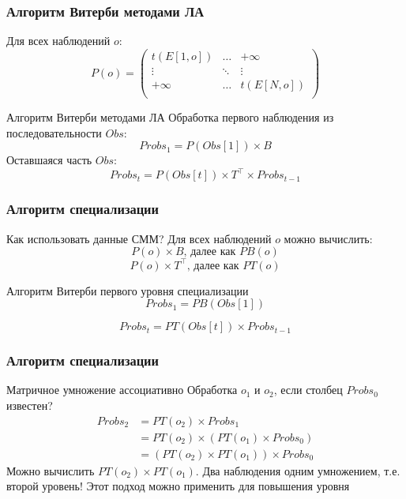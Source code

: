 \documentclass{beamer}
\begin{document}
\begin{frame}[fragile]
	\frametitle{Алгоритм Витерби методами ЛА}
	Для всех наблюдений $o$:
\[
  P(o) =
  \begin{pmatrix}
    t(E[1,o]) & \hdots & +\infty \\
    \vdots & \ddots & \vdots\\
    +\infty & \hdots & t(E[N,o]) \\
  \end{pmatrix}
\]
	\vfill
	\begin{block}{Алгоритм Витерби методами ЛА}
		Обработка первого наблюдения из последовательности $Obs$:
		\[\mathit{Probs}_{1} = P(\mathit{Obs[1]}) \times B\]
		Оставшаяся часть $Obs$:
	\[\mathit{Probs}_{t} = P(\mathit{Obs[t]}) \times T^{\top} \times \mathit{Probs}_{t - 1}\]	
	\end{block}
\end{frame}


\begin{frame}[fragile]
	\frametitle{Алгоритм специализации}
	Как использовать данные СММ?
	\vfill
	Для всех наблюдений $o$ можно вычислить: 
	\[P(\mathit{o}) \times B \text{, далее как } PB(o)\]
	\[P(\mathit{o}) \times T^{\top} \text{, далее как } PT(o)\] 
	\vfill
	\begin{block}{Алгоритм Витерби первого уровня специализации}
		\[\mathit{Probs}_{1} = PB(Obs[1])\]
	
		\[\mathit{Probs}_{t} = PT(Obs[t]) \times \mathit{Probs}_{t - 1}\]

	\end{block}
\end{frame}


\begin{frame}[fragile]
	\frametitle{Алгоритм специализации}
	Матричное умножение ассоциативно
	\vfill
	Обработка $o_1$ и $o_2$, если столбец $Probs_0$ известен?
\begin{align}
  \mathit{Probs}_{2} &= \mathit{PT}(\mathit{o}_{2}) \times \mathit{Probs}_{1}\nonumber\\
  &= \mathit{PT}(\mathit{o}_{2}) \times (\mathit{PT}(\mathit{o}_{1}) \times \mathit{Probs}_{0}) \nonumber\\
  & =(\mathit{PT}(\mathit{o}_{2}) \times \mathit{PT}(\mathit{o}_{1})) \times \mathit{Probs}_{0}
\end{align}
\vfill
Можно вычислить
$\mathit{PT}(\mathit{o}_{2}) \times \mathit{PT}(\mathit{o}_{1})$. 
Два наблюдения одним умножением, т.е. второй уровень!
\vfill
Этот подход можно применить для повышения уровня
\end{frame}
\end{document}
